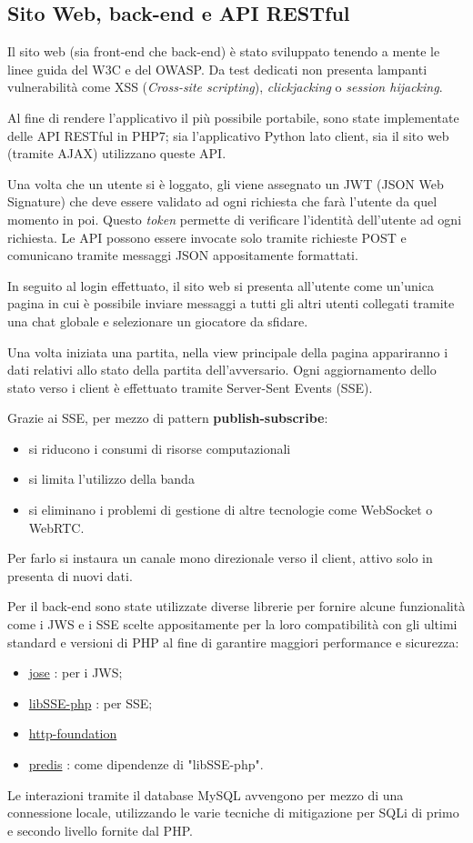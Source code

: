 \subsection{Sito Web, back-end e API RESTful}
Il sito web (sia front-end che back-end) è stato sviluppato tenendo a mente le linee guida del W3C e del OWASP. Da test dedicati non presenta lampanti vulnerabilità come XSS (\textit{Cross-site scripting}), \textit{clickjacking} o \textit{session hijacking}.

Al fine di rendere l'applicativo il più possibile portabile, sono state implementate delle API RESTful in PHP7; sia l'applicativo Python lato client, sia il sito web (tramite AJAX) utilizzano queste API.

Una volta che un utente si è loggato, gli viene assegnato un JWT (JSON Web Signature) che deve essere validato ad ogni richiesta che farà l'utente da quel momento in poi. Questo \textit{token} permette di verificare l'identità dell'utente ad ogni richiesta.
Le API possono essere invocate solo tramite richieste POST e comunicano tramite messaggi JSON appositamente formattati.

In seguito al login effettuato, il sito web si presenta all'utente come un'unica pagina in cui è possibile inviare messaggi a tutti gli altri utenti collegati tramite una chat globale e selezionare un giocatore da sfidare. 

Una volta iniziata una partita, nella view principale della pagina appariranno i dati relativi allo stato della partita dell'avversario. Ogni aggiornamento dello stato verso i client è effettuato tramite Server-Sent Events (SSE).

Grazie ai SSE, per mezzo di pattern \textbf{publish-subscribe}:
\begin{itemize}
	\item si riducono i consumi di risorse computazionali
	\item si limita l'utilizzo della banda
	\item si eliminano i problemi di gestione di altre tecnologie come WebSocket o WebRTC.
\end{itemize} 
Per farlo si instaura un canale mono direzionale verso il client, attivo solo in presenta di nuovi dati.

Per il back-end sono state utilizzate diverse librerie per fornire alcune funzionalità come i JWS e i SSE scelte appositamente per la loro compatibilità con gli ultimi standard e versioni di PHP al fine di garantire maggiori performance e sicurezza:
\begin{itemize}
	\item \href{https://github.com/namshi/jose}{jose} : per i JWS;
	\item \href{https://github.com/licson0729/libSSE-php}{libSSE-php} : per SSE;
	\item \href{https://github.com/symfony/http-foundation}{http-foundation}
	\item \href{https://github.com/nrk/predis}{predis} : come dipendenze di "libSSE-php".
\end{itemize}
Le interazioni tramite il database MySQL avvengono per mezzo di una connessione locale, utilizzando le varie tecniche di mitigazione per SQLi di primo e secondo livello fornite dal PHP.

